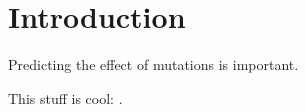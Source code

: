 \chapter{Introduction}

Predicting the effect of mutations is important. 

\cite{pleasance_comprehensive_2010}

\cite{tennessen_evolution_2012}

\cite{lee_mutation_2010}

This stuff is cool: \cite{montelione_protein_2012}.